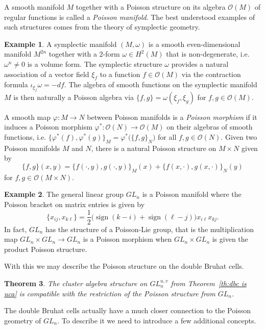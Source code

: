 \documentclass{amsart}
\newtheorem{theorem}{Theorem}[section]
\theoremstyle{definition}
\newtheorem{example}[theorem]{Example}
\theoremstyle{remark}
\numberwithin{equation}{section}
\newcommand{\cO}{{\mathcal{O}}}
\newcommand{\sgn}{\operatorname{sign}}
\begin{document}
  A smooth manifold $M$ together with a Poisson structure on its algebra $\cO(M)$ of regular functions is called a \emph{Poisson manifold}.  The best understood examples of such structures comes from the theory of symplectic geometry.
  \begin{example}
    A symplectic manifold $(M,\omega)$ is a smooth even-dimensional manifold $M^{2n}$ together with a 2-form $\omega\in H^2(M)$ that is non-degenerate, i.e. $\omega^n\ne0$ is a volume form.  The symplectic structure $\omega$ provides a natural association of a vector field $\xi_f$ to a function $f\in\cO(M)$ via the contraction formula $\iota_{\xi_f}\omega=-df$.  The algebra of smooth functions on the symplectic manifold $M$ is then naturally a Poisson algebra via $\{f,g\}=\omega(\xi_f,\xi_g)$ for $f,g\in\cO(M)$.
  \end{example}  
  A smooth map $\varphi:M\to N$ between Poisson manifolds is a \emph{Poisson morphism} if it induces a Poisson morphism $\varphi^*:\cO(N)\to\cO(M)$ on their algebras of smooth functions, i.e. $\{\varphi^*(f),\varphi^*(g)\}_M=\varphi^*\big(\{f,g\}_N\big)$ for all $f,g\in \cO(N)$.  Given two Poisson manifolds $M$ and $N$, there is a natural Poisson structure on $M\times N$ given by
  \[\{f,g\}(x,y)=\{f(\cdot,y),g(\cdot,y)\}_M(x)+\{f(x,\cdot),g(x,\cdot)\}_N(y)\]
  for $f,g\in\cO(M\times N)$.
  \begin{example}
    The general linear group $GL_n$ is a Poisson manifold where the Poisson bracket on matrix entries is given by
    \begin{equation}
      \{x_{ij},x_{k\ell}\}=\frac{1}{2}\big(\sgn(k-i)+\sgn(\ell-j)\big)x_{i\ell}x_{kj}.
    \end{equation}
    In fact, $GL_n$ has the structure of a Poisson-Lie group, that is the multiplication map $GL_n\times GL_n\to GL_n$ is a Poisson morphism when $GL_n\times GL_n$ is given the product Poisson structure.
  \end{example}
  With this we may describe the Poisson structure on the double Bruhat cells.
  \begin{theorem}\cite{GSV10}
    The cluster algebra structure on $GL_n^{u,v}$ from Theorem~\ref{th:dbc is uca} is compatible with the restriction of the Poisson structure from $GL_n$.
  \end{theorem}

  The double Bruhat cells actually have a much closer connection to the Poisson geometry of $GL_n$.  To describe it we need to introduce a few additional concepts.
\end{document}
